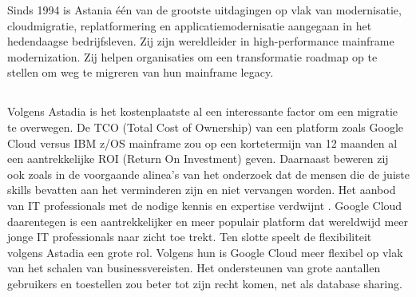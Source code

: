 Sinds 1994 is Astania één van de grootste uitdagingen op vlak van modernisatie, cloudmigratie, replatformering en applicatiemodernisatie aangegaan in het hedendaagse bedrijfsleven. Zij zijn wereldleider in high-performance mainframe modernization. Zij helpen organisaties om een transformatie roadmap op te stellen om weg te migreren van hun mainframe legacy. 

\subsection{}
\label{sec:Waarom zouden we onze mainframe legacy en databases migreren naar Google Cloud?}

Volgens Astadia is het kostenplaatste al een interessante factor om een migratie te overwegen. De TCO (Total Cost of Ownership) van een platform zoals Google Cloud versus IBM z/OS mainframe zou op een kortetermijn van 12 maanden al een aantrekkelijke ROI (Return On Investment) geven. Daarnaast beweren zij ook zoals in de voorgaande alinea's van het onderzoek dat de mensen die de juiste skills bevatten aan het verminderen zijn en niet vervangen worden. Het aanbod van IT professionals met de nodige kennis en expertise verdwijnt \autocite{Astadia2021}. Google Cloud daarentegen is een aantrekkelijker en meer populair platform dat wereldwijd meer jonge IT professionals naar zicht toe trekt. Ten slotte speelt de flexibiliteit volgens Astadia een grote rol. Volgens hun is Google Cloud meer flexibel op vlak van het schalen van businessvereisten. Het ondersteunen van grote aantallen gebruikers en toestellen zou beter tot zijn recht komen, net als database sharing. 

